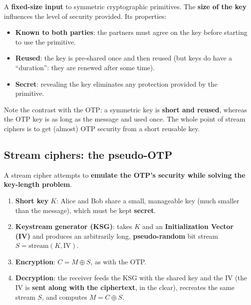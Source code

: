 \begin{definition}
A \textbf{fixed-size input} to symmetric cryptographic primitives. The \textbf{size of the key} influences the level of security provided. Its properties:
\begin{itemize}
    \item \textbf{Known to both parties}: the partners must agree on the key before starting to use the primitive.
    \item \textbf{Reused}: the key is pre-shared once and then reused (but keys do have a ``duration'': they are renewed after some time).
    \item \textbf{Secret}: revealing the key eliminates any protection provided by the primitive.
\end{itemize}
\end{definition}

\begin{remark}
Note the contrast with the OTP: a symmetric key is \textbf{short and reused}, whereas the OTP key is as long as the message and used once. The whole point of stream ciphers is to get (almost) OTP security from a short reusable key.
\end{remark}

\subsection{Stream ciphers: the pseudo-OTP}

A stream cipher attempts to \textbf{emulate the OTP's security while solving the key-length problem}.

\begin{definition}
\begin{enumerate}
    \item \textbf{Short key} $K$: Alice and Bob share a small, manageable key (much smaller than the message), which must be kept \textbf{secret}.
    \item \textbf{Keystream generator (KSG)}: takes $K$ and an \textbf{Initialization Vector (IV)} and produces an arbitrarily long, \textbf{pseudo-random} bit stream $S = \mathrm{stream}(K, \mathrm{IV})$.
    \item \textbf{Encryption}: $C = M \oplus S$, as with the OTP.
    \item \textbf{Decryption}: the receiver feeds the KSG with the shared key and the IV (the IV is \textbf{sent along with the ciphertext}, in the clear), recreates the same stream $S$, and computes $M = C \oplus S$.
\end{enumerate}
\end{definition}

